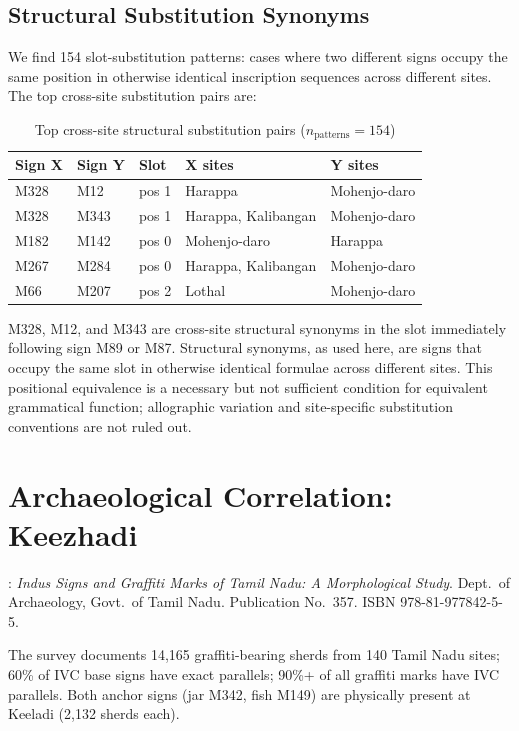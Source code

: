 \documentclass[12pt,letterpaper]{article}
\begin{document}
\subsection{Structural Substitution Synonyms}

We find 154 slot-substitution patterns: cases where two different
signs occupy the same position in otherwise identical inscription
sequences across different sites.
The top cross-site substitution pairs are:

\begin{table}[htbp]
\centering
\caption{Top cross-site structural substitution pairs ($n_{\text{patterns}} = 154$)}
\begin{tabular}{lllll}
\toprule
Sign X & Sign Y & Slot & X sites & Y sites \\
\midrule
M328 & M12  & pos 1 & Harappa & Mohenjo-daro \\
M328 & M343 & pos 1 & Harappa, Kalibangan & Mohenjo-daro \\
M182 & M142 & pos 0 & Mohenjo-daro & Harappa \\
M267 & M284 & pos 0 & Harappa, Kalibangan & Mohenjo-daro \\
M66  & M207 & pos 2 & Lothal & Mohenjo-daro \\
\bottomrule
\end{tabular}
\end{table}

M328, M12, and M343 are cross-site structural synonyms in the slot
immediately following sign M89 or M87.
Structural synonyms, as used here, are signs that occupy the same
slot in otherwise identical formulae across different sites.
This positional equivalence is a necessary but not sufficient
condition for equivalent grammatical function; allographic variation
and site-specific substitution conventions are not ruled out.

\section{Archaeological Correlation: Keezhadi}
\label{sec:keezhadi}

\citet{Rajan2025}: \textit{Indus Signs and Graffiti Marks of Tamil Nadu:
A Morphological Study}. Dept.\ of Archaeology, Govt.\ of Tamil Nadu.
Publication No.\ 357. ISBN 978-81-977842-5-5.

The survey documents 14,165 graffiti-bearing sherds from 140 Tamil Nadu
sites; 60\% of IVC base signs have exact parallels; 90\%+ of all graffiti
marks have IVC parallels.
Both anchor signs (jar M342, fish M149) are physically present at
Keeladi (2,132 sherds each).
\end{document}
